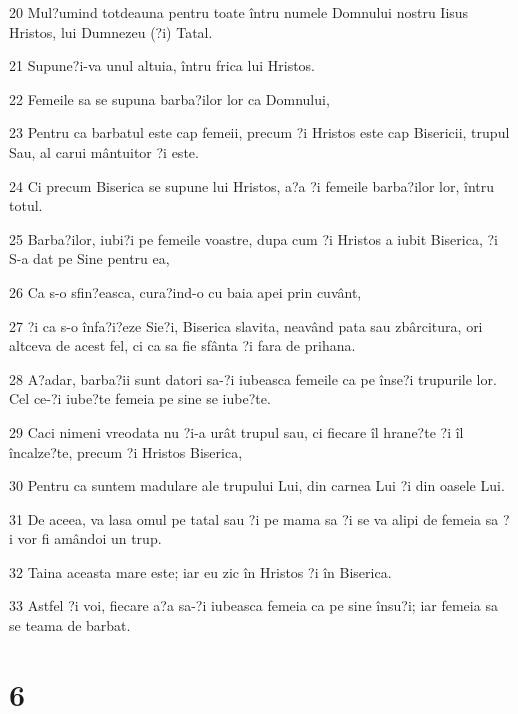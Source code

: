 \par 20 Mul?umind totdeauna pentru toate întru numele Domnului nostru Iisus Hristos, lui Dumnezeu (?i) Tatal.
\par 21 Supune?i-va unul altuia, întru frica lui Hristos.
\par 22 Femeile sa se supuna barba?ilor lor ca Domnului,
\par 23 Pentru ca barbatul este cap femeii, precum ?i Hristos este cap Bisericii, trupul Sau, al carui mântuitor ?i este.
\par 24 Ci precum Biserica se supune lui Hristos, a?a ?i femeile barba?ilor lor, întru totul.
\par 25 Barba?ilor, iubi?i pe femeile voastre, dupa cum ?i Hristos a iubit Biserica, ?i S-a dat pe Sine pentru ea,
\par 26 Ca s-o sfin?easca, cura?ind-o cu baia apei prin cuvânt,
\par 27 ?i ca s-o înfa?i?eze Sie?i, Biserica slavita, neavând pata sau zbârcitura, ori altceva de acest fel, ci ca sa fie sfânta ?i fara de prihana.
\par 28 A?adar, barba?ii sunt datori sa-?i iubeasca femeile ca pe înse?i trupurile lor. Cel ce-?i iube?te femeia pe sine se iube?te.
\par 29 Caci nimeni vreodata nu ?i-a urât trupul sau, ci fiecare îl hrane?te ?i îl încalze?te, precum ?i Hristos Biserica,
\par 30 Pentru ca suntem madulare ale trupului Lui, din carnea Lui ?i din oasele Lui.
\par 31 De aceea, va lasa omul pe tatal sau ?i pe mama sa ?i se va alipi de femeia sa ?i vor fi amândoi un trup.
\par 32 Taina aceasta mare este; iar eu zic în Hristos ?i în Biserica.
\par 33 Astfel ?i voi, fiecare a?a sa-?i iubeasca femeia ca pe sine însu?i; iar femeia sa se teama de barbat.

\chapter{6}

